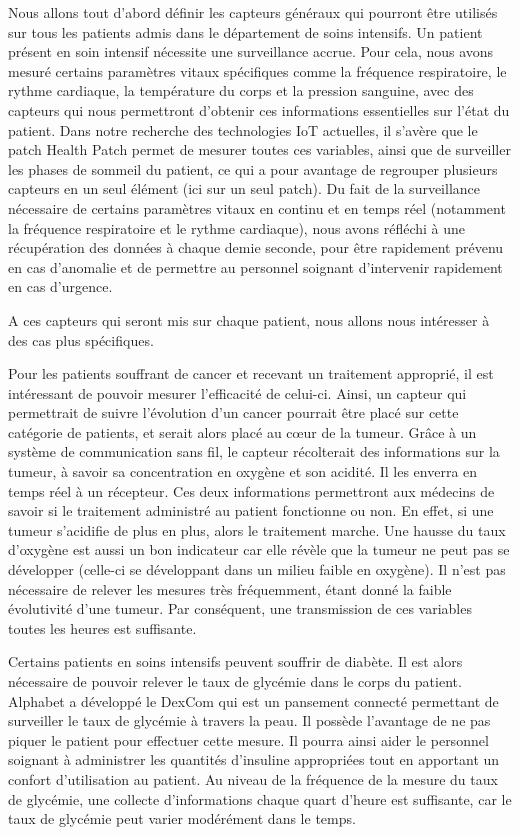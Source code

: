 \documentclass{article}
\begin{document}
Nous allons tout d’abord définir les capteurs généraux qui pourront être utilisés sur tous les patients admis dans le département de soins intensifs. Un patient présent en soin intensif nécessite une surveillance accrue. Pour cela, nous avons mesuré certains paramètres vitaux spécifiques comme la fréquence respiratoire, le rythme cardiaque, la température du corps et la pression sanguine, avec des capteurs qui nous permettront d’obtenir ces informations essentielles sur l’état du patient.  Dans notre recherche des technologies IoT actuelles, il s’avère que le patch Health Patch \cite{HealthPatch} permet de mesurer toutes ces variables, ainsi que de surveiller les phases de sommeil du patient, ce qui a pour avantage de regrouper plusieurs capteurs en un seul élément (ici sur un seul patch). Du fait de la surveillance nécessaire de certains paramètres vitaux en continu et en temps réel (notamment la fréquence respiratoire et le rythme cardiaque), nous avons réfléchi à une récupération des données à chaque demie seconde, pour être rapidement prévenu en cas d’anomalie et de permettre au personnel soignant d’intervenir rapidement en cas d’urgence.

A ces capteurs qui seront mis sur chaque patient, nous allons nous intéresser à des cas plus spécifiques.

Pour les patients souffrant de cancer et recevant un traitement approprié, il est intéressant de pouvoir mesurer l’efficacité de celui-ci. Ainsi, un capteur qui permettrait de suivre l’évolution d’un cancer \cite{Cancer} pourrait être placé sur cette catégorie de patients, et serait alors placé au cœur de la tumeur. Grâce à un système de communication sans fil, le capteur récolterait des informations sur la tumeur, à savoir sa concentration en oxygène et son acidité. Il les enverra en temps réel à un récepteur. Ces deux informations permettront aux médecins de savoir si le traitement administré au patient fonctionne ou non. En effet, si une tumeur s’acidifie de plus en plus, alors le traitement marche. Une hausse du taux d’oxygène est aussi un bon indicateur car elle révèle que la tumeur ne peut pas se développer (celle-ci se développant dans un milieu faible en oxygène). Il n’est pas nécessaire de relever les mesures très fréquemment, étant donné la faible évolutivité d’une tumeur. Par conséquent, une transmission de ces variables toutes les heures est suffisante.

Certains patients en soins intensifs peuvent souffrir de diabète. Il est alors nécessaire de pouvoir relever le taux de glycémie dans le corps du patient. Alphabet a développé le DexCom \cite{Diabete} qui  est un pansement connecté permettant de surveiller le taux de glycémie à travers la peau. Il possède l’avantage de ne pas piquer le patient pour effectuer cette mesure. Il pourra ainsi aider le personnel soignant à administrer les quantités d’insuline appropriées tout en apportant un confort d’utilisation au patient.  Au niveau de la fréquence de la mesure du taux de glycémie, une collecte d’informations chaque quart d'heure est suffisante, car le taux de glycémie peut varier modérément dans le temps.
\end{document}
